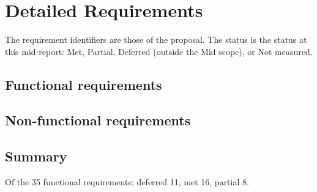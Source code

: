 \chapter{Detailed Requirements}

The requirement identifiers are those of the proposal. The status is the status at this mid-report: Met, Partial, Deferred (outside the Mid scope), or Not measured.

\section*{Functional requirements}



\section*{Non-functional requirements}



\section*{Summary}

Of the 35 functional requirements: deferred 11, met 16, partial 8.
